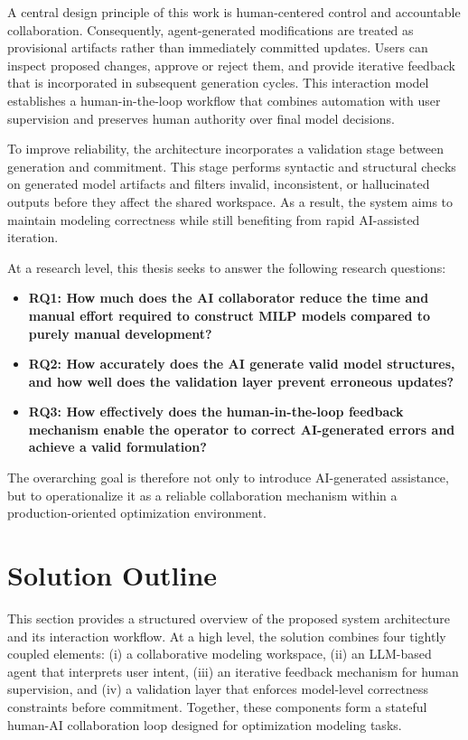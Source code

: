 A central design principle of this work is human-centered control and accountable collaboration. Consequently, agent-generated modifications are treated as provisional artifacts rather than immediately committed updates. Users can inspect proposed changes, approve or reject them, and provide iterative feedback that is incorporated in subsequent generation cycles. This interaction model establishes a human-in-the-loop workflow that combines automation with user supervision and preserves human authority over final model decisions.

To improve reliability, the architecture incorporates a validation stage between generation and commitment. This stage performs syntactic and structural checks on generated model artifacts and filters invalid, inconsistent, or hallucinated outputs before they affect the shared workspace. As a result, the system aims to maintain modeling correctness while still benefiting from rapid AI-assisted iteration.

At a research level, this thesis seeks to answer the following research questions:

\begin{itemize}
    \item \textbf{RQ1: How much does the AI collaborator reduce the time and manual effort required to construct MILP models compared to purely manual development?}
    \item \textbf{RQ2: How accurately does the AI generate valid model structures, and how well does the validation layer prevent erroneous updates?}
    \item \textbf{RQ3: How effectively does the human-in-the-loop feedback mechanism enable the operator to correct AI-generated errors and achieve a valid formulation?}
\end{itemize}

The overarching goal is therefore not only to introduce AI-generated assistance, but to operationalize it as a reliable collaboration mechanism within a production-oriented optimization environment.

\section{Solution Outline}

This section provides a structured overview of the proposed system architecture and its interaction workflow. At a high level, the solution combines four tightly coupled elements: (i) a collaborative modeling workspace, (ii) an LLM-based agent that interprets user intent, (iii) an iterative feedback mechanism for human supervision, and (iv) a validation layer that enforces model-level correctness constraints before commitment. Together, these components form a stateful human-AI collaboration loop designed for optimization modeling tasks.

